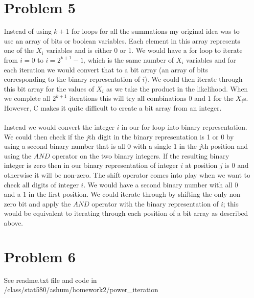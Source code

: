 \documentclass{article}\usepackage[]{graphicx}\usepackage[]{color}
\begin{document}
\section{Problem 5}
Instead of using $k+1$ for loops for all the summations my original idea was to use an array of bits or boolean variables.  Each element in this array represents one of the $X_i$ variables and is either 0 or 1.  We would have a for loop to iterate from $i=0$ to $i=2^{k+1} - 1$, which is the same number of $X_i$ variables and for each iteration we would convert that to a bit array (an array of bits corresponding to the binary representation of $i$).  We could then iterate through this bit array for the values of $X_i$ as we take the product in the likelihood.  When we complete all $2^{k + 1}$ iterations this will try all combinations $0$ and $1$ for the $X_i$s.  However, C makes it quite difficult to create a bit array from an integer.\\
\\
Instead we would convert the integer $i$ in our for loop into binary representation.  We could then check if the $j$th digit in the binary representation is 1 or 0 by using a second binary number that is all $0$ with a single $1$ in the $j$th position and using the $AND$ operator on the two binary integers.  If the resulting binary integer is zero then in our binary representation of integer $i$ at position $j$ is 0 and otherwise it will be non-zero.  The shift operator comes into play when we want to check all digits of integer $i$.  We would have a second binary number with all $0$ and a $1$ in the first position.  We could iterate through by shifting the only non-zero bit and apply the $AND$ operator with the binary representation of $i$; this would be equivalent to iterating through each position of a bit array as described above.

\section{Problem 6}
See readme.txt file and code in /class/stat580/ashum/homework2/power\_iteration
\end{document}
